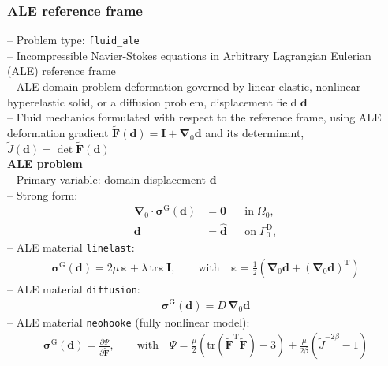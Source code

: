 \documentclass[a4paper,12pt]{report}
\newcommand{\bs}[1]{\boldsymbol{#1}}
\newcommand{\Om}{\mathit{\Omega}}
\newcommand{\Gm}{\mathit{\Gamma}}
\begin{document}
\subsubsection{ALE reference frame}\label{ale-reference-frame}

-- Problem type: \verb.fluid_ale.\\

-- Incompressible Navier-Stokes equations in Arbitrary Lagrangian Eulerian (ALE) reference frame\\

-- ALE domain problem deformation governed by linear-elastic, nonlinear hyperelastic solid, or a diffusion problem, displacement field $\bs{d}$\\

-- Fluid mechanics formulated with respect to the reference frame, using ALE deformation gradient $\widetilde{\bs{F}}(\bs{d}) = \bs{I} + \bs{\nabla}_0\bs{d}$ and its determinant, $\widetilde{J}(\bs{d})=\det \widetilde{\bs{F}}(\bs{d})$\\

\textbf{ALE problem}\\

-- Primary variable: domain displacement $\bs{d}$\\

-- Strong form:
\begin{equation}
\label{equation-ale-strong-form}
\begin{aligned}
\bs{\nabla}_{0} \cdot \bs{\sigma}^{\mathrm{G}}(\bs{d}) &= \bs{0} &&\text{in} \; \mathit{\Om}_0, \\
\bs{d} &= \hat{\bs{d}} &&\text{on} \; \mathit{\Gm}_0^{\mathrm{D}},
\end{aligned}
\end{equation}
-- ALE material \verb.linelast.:
\begin{equation}
\begin{aligned}
\bs{\sigma}^{\mathrm{G}}(\bs{d}) = 2\mu \,\bs{\varepsilon} + \lambda \,\mathrm{tr}\bs{\varepsilon}\,\bs{I}, \qquad \text{with}\quad \bs{\varepsilon} = \frac{1}{2}\left(\bs{\nabla}_0\bs{d} + (\bs{\nabla}_0\bs{d})^{\mathrm{T}}\right)
\end{aligned}
\end{equation}
-- ALE material \verb.diffusion.:
\begin{equation}
\begin{aligned}
\bs{\sigma}^{\mathrm{G}}(\bs{d}) = D \,\bs{\nabla}_0\bs{d}
\end{aligned}
\end{equation}
-- ALE material \verb.neohooke. (fully nonlinear model):
\begin{equation}
\begin{aligned}
\bs{\sigma}^{\mathrm{G}}(\bs{d}) = \frac{\partial \mathit{\Psi}}{\partial \widetilde{\bs{F}}}, \qquad \text{with}\quad \mathit{\Psi} = \frac{\mu}{2}\left(\mathrm{tr}(\widetilde{\bs{F}}^{\mathrm{T}}\widetilde{\bs{F}}) - 3\right) + \frac{\mu}{2\beta} \left(\widetilde{J}^{-2\beta} - 1\right)
\end{aligned}
\end{equation}
\end{document}
